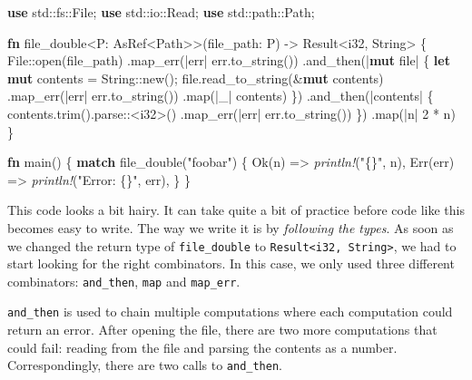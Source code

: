 \documentclass[a4paper,]{book}
\newenvironment{Shaded}{\begin{snugshade}}{\end{snugshade}}
\newcommand{\KeywordTok}[1]{\textcolor[rgb]{0.13,0.29,0.53}{\textbf{{#1}}}}
\newcommand{\DataTypeTok}[1]{\textcolor[rgb]{0.13,0.29,0.53}{{#1}}}
\newcommand{\DecValTok}[1]{\textcolor[rgb]{0.00,0.00,0.81}{{#1}}}
\newcommand{\ConstantTok}[1]{\textcolor[rgb]{0.00,0.00,0.00}{{#1}}}
\newcommand{\StringTok}[1]{\textcolor[rgb]{0.31,0.60,0.02}{{#1}}}
\newcommand{\PreprocessorTok}[1]{\textcolor[rgb]{0.56,0.35,0.01}{\textit{{#1}}}}
\newcommand{\NormalTok}[1]{{#1}}
\begin{document}
\begin{Shaded}
\begin{Highlighting}[]
\KeywordTok{use} \NormalTok{std::fs::File;}
\KeywordTok{use} \NormalTok{std::io::Read;}
\KeywordTok{use} \NormalTok{std::path::Path;}

\KeywordTok{fn} \NormalTok{file_double<P: AsRef<Path>>(file_path: P) -> }\DataTypeTok{Result}\NormalTok{<}\DataTypeTok{i32}\NormalTok{, }\DataTypeTok{String}\NormalTok{> \{}
    \NormalTok{File::open(file_path)}
         \NormalTok{.map_err(|err| err.to_string())}
         \NormalTok{.and_then(|}\KeywordTok{mut} \NormalTok{file| \{}
              \KeywordTok{let} \KeywordTok{mut} \NormalTok{contents = }\DataTypeTok{String}\NormalTok{::new();}
              \NormalTok{file.read_to_string(&}\KeywordTok{mut} \NormalTok{contents)}
                  \NormalTok{.map_err(|err| err.to_string())}
                  \NormalTok{.map(|_| contents)}
         \NormalTok{\})}
         \NormalTok{.and_then(|contents| \{}
              \NormalTok{contents.trim().parse::<}\DataTypeTok{i32}\NormalTok{>()}
                      \NormalTok{.map_err(|err| err.to_string())}
         \NormalTok{\})}
         \NormalTok{.map(|n| }\DecValTok{2} \NormalTok{* n)}
\NormalTok{\}}

\KeywordTok{fn} \NormalTok{main() \{}
    \KeywordTok{match} \NormalTok{file_double(}\StringTok{"foobar"}\NormalTok{) \{}
        \ConstantTok{Ok}\NormalTok{(n) => }\PreprocessorTok{println!}\NormalTok{(}\StringTok{"\{\}"}\NormalTok{, n),}
        \ConstantTok{Err}\NormalTok{(err) => }\PreprocessorTok{println!}\NormalTok{(}\StringTok{"Error: \{\}"}\NormalTok{, err),}
    \NormalTok{\}}
\NormalTok{\}}
\end{Highlighting}
\end{Shaded}

This code looks a bit hairy. It can take quite a bit of practice before
code like this becomes easy to write. The way we write it is by
\emph{following the types}. As soon as we changed the return type of
\texttt{file\_double} to
\texttt{Result\textless{}i32,\ String\textgreater{}}, we had to start
looking for the right combinators. In this case, we only used three
different combinators: \texttt{and\_then}, \texttt{map} and
\texttt{map\_err}.

\texttt{and\_then} is used to chain multiple computations where each
computation could return an error. After opening the file, there are two
more computations that could fail: reading from the file and parsing the
contents as a number. Correspondingly, there are two calls to
\texttt{and\_then}.
\end{document}
